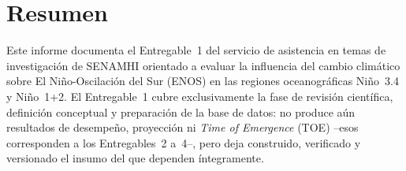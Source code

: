 \documentclass[11pt,a4paper]{article}
\begin{document}
\tableofcontents
\clearpage
\listoffigures
\listoftables
\clearpage

\section{Resumen}

Este informe documenta el Entregable~1 del servicio de asistencia en temas de investigaci\'on de SENAMHI orientado a evaluar la influencia del cambio clim\'atico sobre El Ni\~no-Oscilaci\'on del Sur (ENOS) en las regiones oceanogr\'aficas Ni\~no~3.4 y Ni\~no~1+2. El Entregable~1 cubre exclusivamente la fase de revisi\'on cient\'ifica, definici\'on conceptual y preparaci\'on de la base de datos: no produce a\'un resultados de desempe\~no, proyecci\'on ni \emph{Time of Emergence} (TOE) --esos corresponden a los Entregables~2 a~4--, pero deja construido, verificado y versionado el insumo del que dependen \'integramente.
\end{document}
